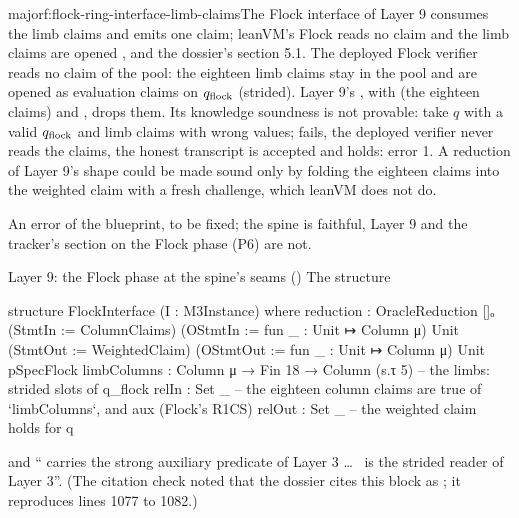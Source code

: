 \begin{finding}{major}{f:flock-ring-interface-limb-claims}{The Flock interface of Layer 9 consumes
the limb claims and emits one claim; leanVM's Flock reads no claim and the limb claims are opened}
 , and the dossier's section 5.1. The deployed
Flock verifier reads no claim of the pool: the eighteen limb claims stay in the pool and are
opened as evaluation claims on $q_{\mathrm{flock}}$ (strided). Layer 9's , with
 (the eighteen claims) and , drops
them. Its knowledge soundness is not provable: take $q$ with a valid $q_{\mathrm{flock}}$ and limb claims
with wrong values;  fails, the deployed verifier never reads the claims, the honest
transcript is accepted and  holds: error 1. A reduction of Layer 9's shape could be
made sound only by folding the eighteen claims into the weighted claim with a fresh challenge,
which leanVM does not do.

 An error of the blueprint, to be fixed; the spine is faithful, Layer 9 and
the tracker's section on the Flock phase (P6) are not.

\begin{change}{Layer 9: the Flock phase at the spine's seams}
\asis () The structure
\begin{leancode}
structure FlockInterface (I : M3Instance) where
  reduction : OracleReduction []ₒ (StmtIn := ColumnClaims) (OStmtIn := fun _ : Unit ↦ Column μ) Unit
      (StmtOut := WeightedClaim) (OStmtOut := fun _ : Unit ↦ Column μ) Unit pSpecFlock
  limbColumns : Column μ → Fin 18 → Column (s.τ 5)      -- the limbs: strided slots of q_flock
  relIn : Set _   -- the eighteen column claims are true of `limbColumns`, and aux (Flock's R1CS)
  relOut : Set _  -- the weighted claim holds for q
\end{leancode}
and \enquote{ carries the strong auxiliary predicate of Layer 3 \dots\
 is the strided reader of Layer 3}. (The citation check noted that the dossier
cites this block as \code{bp:1075-1086}; it reproduces lines 1077 to 1082.)


\end{change}
\end{finding}
